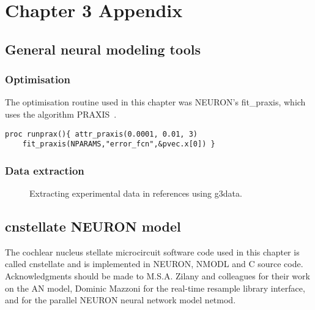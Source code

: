 
\section{Chapter 3 Appendix}\label{sec:ch3:appendix}

\subsection{General neural modeling tools}

\subsubsection{Optimisation}

The optimisation routine used in this chapter was NEURON's \textsf{fit\_praxis},
which uses the algorithm PRAXIS~\citep{Brent:1976}.

\begin{lstlisting}[label=lbl:runprax,caption=Set optimisation attributes and run
  fitting procedure.]
  proc runprax(){ attr_praxis(0.0001, 0.01, 3)
    fit_praxis(NPARAMS,"error_fcn",&pvec.x[0]) }
\end{lstlisting}


\subsubsection{Data extraction}\label{sec:data-extraction}


\begin{figure}[htb]
  \begin{center}
    \caption{Extracting experimental data in references using g3data.}
    \label{fig:Extractdata}
  \end{center}
\end{figure}


\subsection{\textsf{cnstellate} NEURON model}\label{sec:cnstellate-neur-model}

The cochlear nucleus stellate microcircuit software code used in this chapter is
called \textsf{cnstellate} and is implemented in NEURON, NMODL and C source
code. Acknowledgments should be made to M.S.A. Zilany and colleagues for their
work on the AN model, Dominic Mazzoni for the real-time resample library
interface, and \citet{MiglioreCanniaEtAl:2006} for the parallel NEURON neural
network model \textsf{netmod}.

